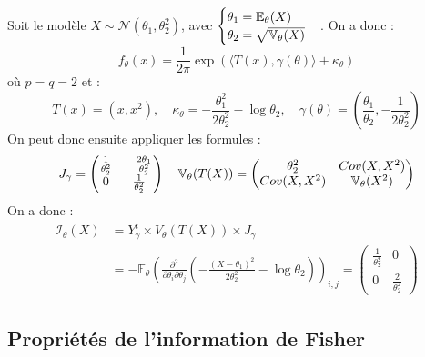 \begin{example}
    Soit le modèle $X \sim \mathcal{N}( \theta_1, \theta_2^2)$, avec 
    $ 
        \begin{cases}
            \theta_1 = \mathbb{E}_\theta(X) \\
            \theta_2 = \sqrt{\mathbb{V}_\theta(X)}
        \end{cases}
    $. 
    On a donc : 
        $$ f_\theta(x) = \frac{1}{2 \pi} \exp \left( \langle T(x), \gamma(\theta) \rangle + \kappa_\theta\right) $$
    où $ p =q = 2$ et : 
        $$ 
            T(x) = (x, x^2), \quad \kappa_\theta = - \frac{ \theta_1^2}{2 \theta_2^2} - \log \theta_2, \quad 
            \gamma(\theta) = \left( \frac{ \theta_1}{ \theta_2}, - \frac{1}{ 2 \theta_2^2}\right) 
        $$
    On peut donc ensuite appliquer les formules : 
        $$ J_\gamma = 
            \begin{pmatrix}
                \frac{1}{ \theta_2^2} & - \frac{2 \theta_1}{ \theta_2^2} \\
                0 & \frac{1}{ \theta_2^2}
            \end{pmatrix}
            \quad \mathbb{V}_\theta(T(X)) = 
            \begin{pmatrix}
                \theta_2^2 & Cov(X, X^2) \\ 
                Cov(X, X^2) & \mathbb{V}_\theta(X^2)
            \end{pmatrix}
        $$ 
    On a donc : 
        \begin{align*}
            \mathcal{I}_\theta(X) &= Y_\gamma^t \times V_\theta(T(X)) \times J_\gamma \\ 
            &= - \mathbb{E}_\theta \left( \frac{\partial^2}{ \partial \theta_i \partial \theta_j} 
                \left(
                    - \frac{(X- \theta_1)^2}{2 \theta_2^2} - \log \theta_2
                \right)
                \right)_{i,j}
            = 
                \begin{pmatrix}
                    \frac{1}{ \theta_2^2} & 0 \\ 
                    0 & \frac{2}{ \theta_2^2}
                \end{pmatrix}
        \end{align*}
\end{example}


\subsection{Propriétés de l'information de Fisher}

